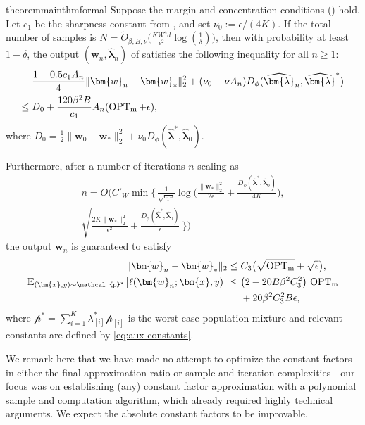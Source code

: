 \documentclass[11pt]{article}
\newcounter{thm}
\numberwithin{thm}{section}
\theoremstyle{plain}
\theoremstyle{definition}
\theoremstyle{remark} \newtheorem{remark}[thm]{Remark}
\def\eps{{\epsilon}}
\def\vlambda{{\bm{\lambda}}}
\def\vw{{\bm{w}}}
\def\vx{{\bm{x}}}
\def\pp{{\mathcal{p}}}
\newcommand{\E}{\mathbb{E}}
\newcommand{\lambdai}{\lambda_{[i]}}
\newcommand{\evlambda}{\widehat{\vlambda}}
\DeclareMathOperator{\mOPT}{OPT_m}
\begin{document}
\begin{restatable}{theorem}{mainthmformal}\label{thm:main-formal}
Suppose the margin and concentration conditions () hold. Let $c_1$ be the sharpness constant from , and set $\nu_0 := \epsilon/(4K)$. If the total number of samples is $N =\tilde O_{\beta,B,\nu}\bigl(\frac{KW^{4}d}{\epsilon^{2}}\log(\frac{1}{\delta})\bigr)$,
then with probability at least $1-\delta$, the output $(\vw_n,\evlambda_n)$ of  satisfies the following inequality for all $n \ge 1$:
\begin{align}\label{eq:main-proof-inequality}
&\frac{1+0.5c_1A_n}{4}\|\vw_n-\vw_*\|_2^2 + (\nu_0+\nu A_n)D_{\phi}(\evlambda_n, \evlambda^*) \notag \\
\le\;& D_0 + \frac{120\beta^2B}{c_1} A_n (\mOPT + \epsilon),
\end{align}
where  $D_0 = \frac{1}{2}\|\vw_0 - \vw_*\|_{2}^{2} + \nu_0 D_{\phi}(\evlambda^*, \evlambda_0)$.

Furthermore, after a number of iterations $n$ scaling as
\begin{equation}
\begin{split}
n = O\Big( C'_W \min\{ \,
 \tfrac{1}{\sqrt{c_1 \nu}}\log\!\big(
   \tfrac{\|\vw_*\|_2^2}{2\eps}
   + \tfrac{D_{\phi}(\evlambda^*,\evlambda_0)}{4K}
 \big), \\
 \sqrt{
   \tfrac{2K\|\vw_*\|_2^2}{\eps^2}
   + \tfrac{D_{\phi}(\evlambda^*,\evlambda_0)}{\eps}
 } \,\} \Big)
\end{split}
\end{equation}
the output $\vw_n$ is guaranteed to satisfy
\begin{align}
   \|\vw_{n}-\vw_*\|_{2} \le\; & C_{3}\bigl(\sqrt{\mOPT}+\sqrt{\epsilon}\bigr),\label{eq:distance-to-opt-bound}\\
   \E_{(\vx,y)\sim \pp^{*}}\bigl[\ell(\vw_{n};\vx,y)\bigr] 
 \le \; &
\bigl(2+20B\beta^{2}C_{3}^{2}\bigr)\,\mOPT\notag\\
&+ 20\beta^{2} C_3^2B\epsilon,
\label{eq:square-loss-bound}
\end{align}
where $\pp^* = \sum_{i=1}^K \lambdai^* \pp_{[i]}$ is the worst-case population mixture and relevant constants are defined by \eqref{eq:aux-constants}. 
\end{restatable}

We remark here that we have made no attempt to optimize the constant factors in either the final approximation ratio or sample and iteration complexities---our focus was on establishing (any) constant factor approximation with a polynomial sample and computation algorithm, which already required highly technical arguments. We expect the absolute constant factors to be improvable. 
\end{document}
